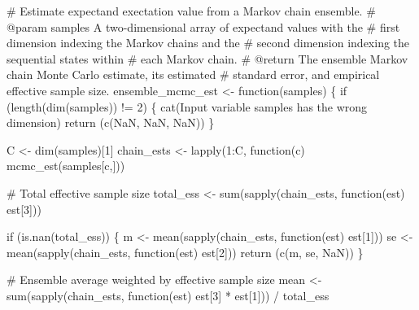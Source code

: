 \documentclass[
  letterpaper,
  DIV=11,
  numbers=noendperiod]{scrartcl}
\newenvironment{Shaded}{\begin{snugshade}}{\end{snugshade}}
\newcommand{\CommentTok}[1]{\textcolor[rgb]{0.37,0.37,0.37}{#1}}
\newcommand{\ConstantTok}[1]{\textcolor[rgb]{0.56,0.35,0.01}{#1}}
\newcommand{\ControlFlowTok}[1]{\textcolor[rgb]{0.00,0.23,0.31}{#1}}
\newcommand{\DecValTok}[1]{\textcolor[rgb]{0.68,0.00,0.00}{#1}}
\newcommand{\FunctionTok}[1]{\textcolor[rgb]{0.28,0.35,0.67}{#1}}
\newcommand{\NormalTok}[1]{\textcolor[rgb]{0.00,0.23,0.31}{#1}}
\newcommand{\OtherTok}[1]{\textcolor[rgb]{0.00,0.23,0.31}{#1}}
\newcommand{\SpecialCharTok}[1]{\textcolor[rgb]{0.37,0.37,0.37}{#1}}
\newcommand{\StringTok}[1]{\textcolor[rgb]{0.13,0.47,0.30}{#1}}
\begin{document}
\begin{Shaded}
\begin{Highlighting}[]
\CommentTok{\# Estimate expectand exectation value from a Markov chain ensemble.}
\CommentTok{\# @param samples A two{-}dimensional array of expectand values with the }
\CommentTok{\#                first dimension indexing the Markov chains and the }
\CommentTok{\#                second dimension indexing the sequential states within }
\CommentTok{\#                each Markov chain.}
\CommentTok{\# @return The ensemble Markov chain Monte Carlo estimate, its estimated}
\CommentTok{\#         standard error, and empirical effective sample size.}
\NormalTok{ensemble\_mcmc\_est }\OtherTok{\textless{}{-}} \ControlFlowTok{function}\NormalTok{(samples) \{}
  \ControlFlowTok{if}\NormalTok{ (}\FunctionTok{length}\NormalTok{(}\FunctionTok{dim}\NormalTok{(samples)) }\SpecialCharTok{!=} \DecValTok{2}\NormalTok{) \{}
    \FunctionTok{cat}\NormalTok{(}\StringTok{\textquotesingle{}Input variable \textasciigrave{}samples\textasciigrave{} has the wrong dimension\textquotesingle{}}\NormalTok{)}
    \FunctionTok{return}\NormalTok{ (}\FunctionTok{c}\NormalTok{(}\ConstantTok{NaN}\NormalTok{, }\ConstantTok{NaN}\NormalTok{, }\ConstantTok{NaN}\NormalTok{))}
\NormalTok{  \}}
  
\NormalTok{  C }\OtherTok{\textless{}{-}} \FunctionTok{dim}\NormalTok{(samples)[}\DecValTok{1}\NormalTok{]}
\NormalTok{  chain\_ests }\OtherTok{\textless{}{-}} \FunctionTok{lapply}\NormalTok{(}\DecValTok{1}\SpecialCharTok{:}\NormalTok{C, }\ControlFlowTok{function}\NormalTok{(c) }\FunctionTok{mcmc\_est}\NormalTok{(samples[c,]))}
  
  \CommentTok{\# Total effective sample size}
\NormalTok{  total\_ess }\OtherTok{\textless{}{-}} \FunctionTok{sum}\NormalTok{(}\FunctionTok{sapply}\NormalTok{(chain\_ests, }\ControlFlowTok{function}\NormalTok{(est) est[}\DecValTok{3}\NormalTok{]))}
  
  \ControlFlowTok{if}\NormalTok{ (}\FunctionTok{is.nan}\NormalTok{(total\_ess)) \{}
\NormalTok{    m }\OtherTok{\textless{}{-}} \FunctionTok{mean}\NormalTok{(}\FunctionTok{sapply}\NormalTok{(chain\_ests, }\ControlFlowTok{function}\NormalTok{(est) est[}\DecValTok{1}\NormalTok{]))}
\NormalTok{    se }\OtherTok{\textless{}{-}} \FunctionTok{mean}\NormalTok{(}\FunctionTok{sapply}\NormalTok{(chain\_ests, }\ControlFlowTok{function}\NormalTok{(est) est[}\DecValTok{2}\NormalTok{]))}
    \FunctionTok{return}\NormalTok{ (}\FunctionTok{c}\NormalTok{(m, se, }\ConstantTok{NaN}\NormalTok{))}
\NormalTok{  \}}
  
  \CommentTok{\# Ensemble average weighted by effective sample size}
\NormalTok{  mean }\OtherTok{\textless{}{-}} \FunctionTok{sum}\NormalTok{(}\FunctionTok{sapply}\NormalTok{(chain\_ests,}
                     \ControlFlowTok{function}\NormalTok{(est) est[}\DecValTok{3}\NormalTok{] }\SpecialCharTok{*}\NormalTok{ est[}\DecValTok{1}\NormalTok{])) }\SpecialCharTok{/}\NormalTok{ total\_ess}
  

\end{Highlighting}
\end{Shaded}
\end{document}
